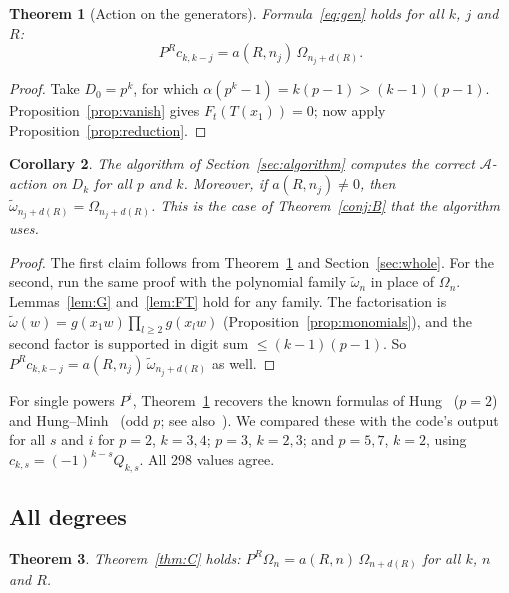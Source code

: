 \documentclass[11pt]{amsart}
\newtheorem{theorem}{Theorem}[section]
\newtheorem{corollary}[theorem]{Corollary}
\theoremstyle{definition}
\theoremstyle{remark}
\newcommand{\A}{\mathcal{A}}
\newcommand{\Dk}{D_k}
\newcommand{\wt}{\widetilde{\omega}}
\begin{document}
\begin{theorem}[Action on the generators]\label{thm:gen}
Formula~\eqref{eq:gen} holds for all $k$, $j$ and $R$:
\[
  P^R c_{k,k-j}=a(R,n_j)\,\Omega_{n_j+d(R)} .
\]
\end{theorem}

\begin{proof}
Take $D_0=p^k$, for which $\alpha(p^k-1)=k(p-1)>(k-1)(p-1)$.
Proposition~\ref{prop:vanish} gives $F_t(T(x_1))=0$; now apply
Proposition~\ref{prop:reduction}.
\end{proof}

\begin{corollary}\label{cor:algo}
The algorithm of Section~\ref{sec:algorithm} computes the correct
$\A$-action on $\Dk$ for all $p$ and $k$.  Moreover, if $a(R,n_j)\ne0$, then
$\wt_{n_j+d(R)}=\Omega_{n_j+d(R)}$.  This is the case of Theorem~\ref{conj:B}
that the algorithm uses.
\end{corollary}

\begin{proof}
The first claim follows from Theorem~\ref{thm:gen} and Section~\ref{sec:whole}.
For the second, run the same proof with the polynomial family $\wt_n$ in
place of $\Omega_n$.  Lemmas~\ref{lem:G} and~\ref{lem:FT} hold for any family.
The factorisation is $\wt(w)=g(x_1w)\prod_{l\ge2}g(x_lw)$ (Proposition~\ref{prop:monomials}),
and the second factor is supported in digit sum $\le(k-1)(p-1)$.  So
$P^Rc_{k,k-j}=a(R,n_j)\,\wt_{n_j+d(R)}$ as well.
\end{proof}

For single powers $P^i$, Theorem~\ref{thm:gen} recovers the known formulas of
Hung~\cite{Hung91} ($p=2$) and Hung--Minh~\cite{HungMinh} (odd $p$; see
also~\cite[Thm.~3.4]{Sum21}).  We compared these with the code's output for all
$s$ and $i$ for $p=2$, $k=3,4$; $p=3$, $k=2,3$; and $p=5,7$, $k=2$, using
$c_{k,s}=(-1)^{k-s}Q_{k,s}$.  All 298 values agree.

\subsection{All degrees}
\begin{theorem}\label{thm:all}
Theorem~\ref{thm:C} holds: $P^R\Omega_n=a(R,n)\,\Omega_{n+d(R)}$ for all $k$, $n$
and $R$.
\end{theorem}
\end{document}
